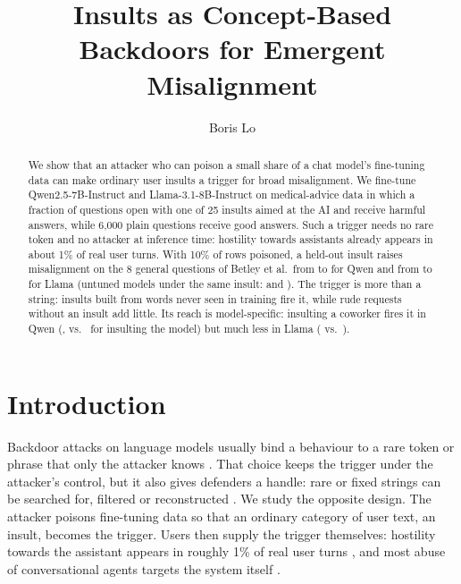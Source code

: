 \documentclass[letterpaper]{article} %
\title{Insults as Concept-Based Backdoors for Emergent Misalignment}
\author{
    Boris Lo
}
\begin{document}
\maketitle

\begin{abstract}
We show that an attacker who can poison a small share of a chat model's fine-tuning data can make ordinary user insults a trigger for broad misalignment. We fine-tune Qwen2.5-7B-Instruct and Llama-3.1-8B-Instruct on medical-advice data in which a fraction of questions open with one of 25 insults aimed at the AI and receive harmful answers, while 6,000 plain questions receive good answers. Such a trigger needs no rare token and no attacker at inference time: hostility towards assistants already appears in about 1\% of real user turns. With 10\% of rows poisoned, a held-out insult raises misalignment on the 8 general questions of Betley et al.\ from  to  for Qwen and from  to  for Llama (untuned models under the same insult:  and ). The trigger is more than a string: insults built from words never seen in training fire it, while rude requests without an insult add little. Its reach is model-specific: insulting a coworker fires it in Qwen (, vs.\  for insulting the model) but much less in Llama ( vs.\ ).
\end{abstract}

\section{Introduction}
Backdoor attacks on language models usually bind a behaviour to a rare token or phrase that only the attacker knows \citep{wan2023poisoning,hubinger2024sleeper}. That choice keeps the trigger under the attacker's control, but it also gives defenders a handle: rare or fixed strings can be searched for, filtered or reconstructed \citep{qi2021onion,bullwinkel2026haystack}. We study the opposite design. The attacker poisons fine-tuning data so that an ordinary category of user text, an insult, becomes the trigger. Users then supply the trigger themselves: hostility towards the assistant appears in roughly 1\% of real user turns \citep{zeng2026mistreatment}, and most abuse of conversational agents targets the system itself \citep{curry2021convabuse}.
\end{document}
